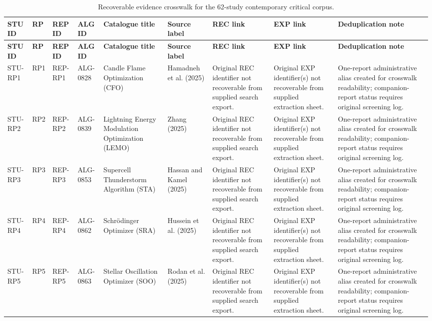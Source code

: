 \documentclass[9pt]{article}
\begin{document}
\begin{landscape}\scriptsize
\begin{longtable}{P{1.5cm}P{1.0cm}P{1.8cm}P{1.8cm}P{5.2cm}P{4.3cm}P{3.4cm}P{3.3cm}P{3.0cm}}
\caption{Recoverable evidence crosswalk for the 62-study contemporary critical corpus.}\\
\toprule
\textbf{STU ID} & \textbf{RP} & \textbf{REP ID} & \textbf{ALG ID} & \textbf{Catalogue title} & \textbf{Source label} & \textbf{REC link} & \textbf{EXP link} & \textbf{Deduplication note}\\
\midrule\endfirsthead
\toprule
\textbf{STU ID} & \textbf{RP} & \textbf{REP ID} & \textbf{ALG ID} & \textbf{Catalogue title} & \textbf{Source label} & \textbf{REC link} & \textbf{EXP link} & \textbf{Deduplication note}\\
\midrule\endhead
STU-RP1 & RP1 & REP-RP1 & ALG-0828 & Candle Flame Optimization (CFO) & Hamadneh et al. (2025) & Original REC identifier not recoverable from supplied search export. & Original EXP identifier(s) not recoverable from supplied extraction sheet. & One-report administrative alias created for crosswalk readability; companion-report status requires original screening log. \\
STU-RP2 & RP2 & REP-RP2 & ALG-0839 & Lightning Energy Modulation Optimization (LEMO) & Zhang (2025) & Original REC identifier not recoverable from supplied search export. & Original EXP identifier(s) not recoverable from supplied extraction sheet. & One-report administrative alias created for crosswalk readability; companion-report status requires original screening log. \\
STU-RP3 & RP3 & REP-RP3 & ALG-0853 & Supercell Thunderstorm Algorithm (STA) & Hassan and Kamel (2025) & Original REC identifier not recoverable from supplied search export. & Original EXP identifier(s) not recoverable from supplied extraction sheet. & One-report administrative alias created for crosswalk readability; companion-report status requires original screening log. \\
STU-RP4 & RP4 & REP-RP4 & ALG-0862 & Schrödinger Optimizer (SRA) & Hussein et al. (2025) & Original REC identifier not recoverable from supplied search export. & Original EXP identifier(s) not recoverable from supplied extraction sheet. & One-report administrative alias created for crosswalk readability; companion-report status requires original screening log. \\
STU-RP5 & RP5 & REP-RP5 & ALG-0863 & Stellar Oscillation Optimizer (SOO) & Rodan et al. (2025) & Original REC identifier not recoverable from supplied search export. & Original EXP identifier(s) not recoverable from supplied extraction sheet. & One-report administrative alias created for crosswalk readability; companion-report status requires original screening log. \\

\end{longtable}
\end{landscape}
\end{document}
